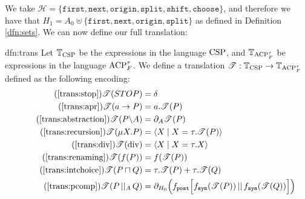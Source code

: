 \documentclass[../hons_project.tex]{subfiles}
\begin{document}
We take $\mathscr{H} = \{\mathtt{first}, \mathtt{next}, \mathtt{origin}, \mathtt{split}, \mathtt{shift}, \mathtt{choose}\}$, and therefore we have that $H_{1} = A_{0} \uplus \{\mathtt{first}, \mathtt{next}, \mathtt{origin}, \mathtt{split}\}$ as defined in Definition \ref{dfn:sets}. We can now define our full translation:

\begin{dfn}{dfn:trans}{}
	Let $\mathbb{T}_{\mathrm{CSP}}$ be the expressions in the language $\mathrm{CSP}$, and $\mathbb{T}_{\mathrm{ACP}_{F}^{\tau}}$ be expressions in the language $\mathrm{ACP}_{F}^{\tau}$. We define a translation $\mathscr{T} : \mathbb{T}_{\mathrm{CSP}} \to \mathbb{T}_{\mathrm{ACP}_{F}^{\tau}}$ defined as the following encoding:
	\begin{align}
		\tag{\ref{trans:stop}}
		\trans{STOP}& = \delta\\
		\tag{\ref{trans:apr}}
		\trans{a \to P}        & = a.\trans{P}                                                                                                                                                                                \\
		\tag{\ref{trans:abstraction}}
		\trans{P \backslash A} & = \partial_{A}{\trans{P}}                                                                                                                                                                    \\
		\tag{\ref{trans:recursion}}
		\trans{\mu X.P} &= \langle X \mid X = \tau.\trans{P} \rangle \\
		\tag{\ref{trans:div}}
		\trans{\mathrm{div}}   & = \langle X \mid X = \tau.X \rangle                                                                                                                                                          \\
		\tag{\ref{trans:renaming}}
		\trans{f(P)}           & = f(\trans{P})                                                                                                                                                                               \\
		\tag{\ref{trans:intchoice}}
		\trans{P \intchoice Q} & = \tau.\trans{P} + \tau.\trans{Q}                                                                                                                                                            \\
		\tag{\ref{trans:pcomp}}
		\trans{P \pcomp Q}     & = \partial_{H_{0}}\Bigl(\fdef{post}\Bigl[\fdef{syn}(\trans{P}) \merge \fdef{syn}(\trans{Q})\Bigr]\Bigr)                                                                                      \\

\end{align}
\end{dfn}
\end{document}
